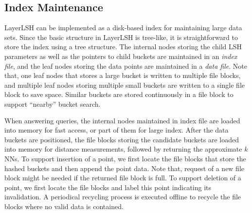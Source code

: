 \subsection{Index Maintenance}

LayerLSH can be implemented as a disk-based index for maintaining large data sets. Since the basic structure in LayerLSH is tree-like, it is straightforward to store the index using a tree structure. The internal nodes storing the child LSH parameters as well as the pointers to child buckets are maintained in an \emph{index file}, and the leaf nodes storing the data points are maintained in a \emph{data file}. Note that, one leaf nodes that stores a large bucket is written to multiple file blocks, and multiple leaf nodes storing multiple small buckets are written to a single file block to save space. Similar buckets are stored continuously in a file block to support ``nearby'' bucket search.

When answering queries, the internal nodes maintained in index file are loaded into memory for fast access, or part of them for large index. After the data buckets are positioned, the file blocks storing the candidate buckets are loaded into memory for distance measurements, followed by returning the approximate $k$NNs. To support insertion of a point, we first locate the file blocks that store the hashed buckets and then append the point data. Note that, request of a new file block might be needed if the returned file block is full. To support deletion of a point, we first locate the file blocks and label this point indicating its invalidation. A periodical recycling process is executed offline to recycle the file blocks where no valid data is contained.











